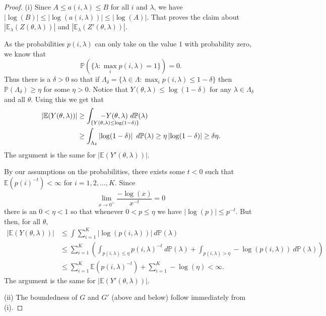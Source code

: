 \documentclass{amsart}
\theoremstyle{plain}
\numberwithin{equation}{section}
\renewcommand{\P}{{\mathbb P}}
\newcommand{\ee}{{\mathbb E}}
\begin{document}
\begin{proof}
(i) Since $A\leq a(i,\lambda)\leq B$ for all $i$ and $\lambda $, we have $|\log (B)|\leq |\log (a(i,\lambda))|\leq |\log (A)|$. 
That proves the claim about $\left| \ee_\lambda(Z(\theta,\lambda))\right| $ and 
$\left| \ee_\lambda (Z'(\theta,\lambda))\right|$.

As the probabilities $p(i,\lambda)$ can only take on the value $1$ with probability zero, we know that 
\begin{equation*}
    \P(\{\lambda :\max_{i}p(i,\lambda)=1\})=0.
\end{equation*}
Thus there is a $\delta >0$ so that if $\Lambda_\delta=\{\lambda \in \Lambda :\max_{i}p(i,\lambda)\leq 1-\delta \}$ 
then $\P(\Lambda_\delta)\geq \eta $ for some $\eta >0$. 
Notice that $Y(\theta,\lambda)\leq \log (1-\delta)$ for any $\lambda \in \Lambda_\delta$ and all $\theta$. 
Using this we get that 
\begin{align*}
\left| \ee(Y(\theta,\lambda))\right| & \geq \int_{\{ Y(\theta,\lambda)\leq \log (1-\delta) \} } \hskip -2 cm -Y(\theta,\lambda)\ d\P(\lambda) \\
                   & \geq \int_{\Lambda_{\delta}}\left| \log (1-\delta)\right| \ d\P(\lambda)\geq 
                                     \eta \left| \log (1-\delta)\right| \geq \delta \eta.
\end{align*}
The argument is the same for $\left| \ee(Y'(\theta,\lambda))\right|$.

By our assumptions on the probabilities, there exists some $t<0$ such that $\ee(p(i)^{-t})<\infty $ for $i=1,2,\ldots ,K$. Since 
\begin{equation*}
     \lim_{x\rightarrow 0^{+}}\frac{-\log (x)}{x^{-t}}=0
\end{equation*}
there is an $0<\eta <1$ so that whenever $0<p\leq \eta $ we have $|\log(p)|\leq p^{-t}$. 
But then, for all $\theta $, 
\begin{align*}
   |\ee(Y(\theta,\lambda))|& \leq \int \sum_{i=1}^K |\log (p(i,\lambda))|\ d\P(\lambda) \\[10pt]
         & \leq \sum_{i=1}^K\left( \int_{p(i,\lambda)\leq \eta}p(i,\lambda)^{-t}\ d\P(\lambda)+
                           \int_{p(i,\lambda)>\eta}-\log (p(i,\lambda))\ d\P(\lambda)\right)  \\[10pt]
                   & \leq \sum_{i=1}^K \ee(p(i,\lambda)^{-t})+\sum_{i=1}^K -\log (\eta) < \infty.
\end{align*}
The argument is the same for $|\ee(Y'(\theta,\lambda))|$.

(ii) The boundedness of $G$ and $G'$ (above and below) follow immediately from (i).
\end{proof}
\end{document}
